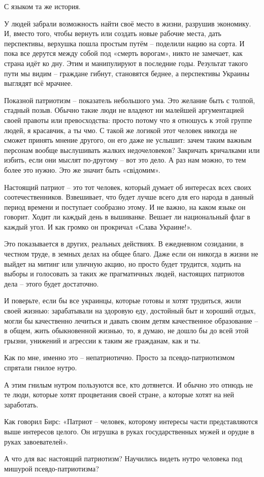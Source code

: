 С языком та же история. 

У людей забрали возможность найти своё место в жизни, разрушив экономику. И,
вместо того, чтобы вернуть или создать новые рабочие места, дать перспективы,
верхушка пошла простым путём – поделили нацию на сорта. И пока все дерутся
между собой под «смерть ворогам», никто не замечает, как страна идёт ко дну.
Этим и манипулируют в последние годы. Результат такого пути мы видим – граждане
гибнут, становятся беднее, а перспективы Украины выглядят всё мрачнее. 

Показной патриотизм – показатель небольшого ума. Это желание быть с толпой,
стадный позыв. Обычно такие люди не владеют ни малейшей аргументацией своей
правоты или превосходства: просто потому что я отношусь к этой группе людей, я
красавчик, а ты чмо. С такой же логикой этот человек никогда не сможет принять
мнение другого, он его даже не услышит: зачем таким важным персонам вообще
выслушивать жалких недочеловеков? Закричать кричалками или избить, если они
мыслят по-другому – вот это дело. А раз нам можно, то тем более это нужно. Это
же значит быть «свідомим». 

Настоящий патриот – это тот человек, который думает об интересах всех своих
соотечественников. Взвешивает, что будет лучше всего для его народа в данный
период времени и поступает сообразно этому. И не важно, на каком языке он
говорит. Ходит ли каждый день в вышиванке. Вешает ли национальный флаг в каждый
угол. И как громко он прокричал «Слава Украине!». 


Это показывается в других, реальных действиях. В ежедневном созидании, в
честном труде, в земных делах на общее благо. Даже если он никогда в жизни не
выйдет на митинг или уличную акцию, но просто будет трудится, ходить на выборы
и голосовать за таких же прагматичных людей, настоящих патриотов дела – этого
будет достаточно. 

И поверьте, если бы все украинцы, которые готовы и хотят трудиться, жили своей
жизнью: зарабатывали на здоровую еду, достойный быт и хороший отдых, могли бы
качественно лечиться и давать своим детям качественное образование – в общем,
жить обыкновенной жизнью, то, я думаю, не дошло бы до всей этой грызни,
унижений и агрессии к таким же гражданам, как и ты.

Как по мне, именно это – непатриотично.  Просто за псевдо-патриотизмом спрятали гнилое нутро.

А этим гнилым нутром пользуются все, кто дотянется. И обычно это отнюдь не те
люди, которые хотят процветания своей стране, а которые хотят на ней
заработать. 

Как говорил Бирс: «Патриот – человек, которому интересы части представляются
выше интересов целого. Он игрушка в руках государственных мужей и орудие в
руках завоевателей».

А что для вас настоящий патриотизм? Научились видеть нутро человека под мишурой псевдо-патриотизма?

